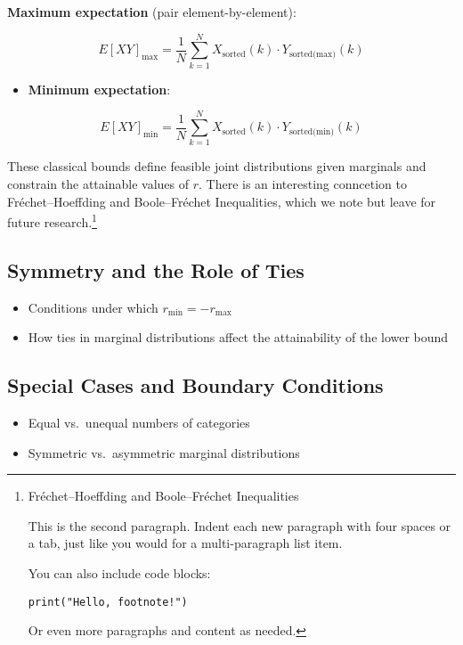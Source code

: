 \documentclass[
  12pt,
]{article}
\providecommand{\tightlist}{%
  \setlength{\itemsep}{0pt}\setlength{\parskip}{0pt}}\usepackage{longtable,booktabs,array}
\begin{document}
\textbf{Maximum expectation} (pair element-by-element):

\[E[XY]_{\text{max}} = \frac{1}{N}\sum_{k=1}^{N} X_{\text{sorted}}(k)\cdot Y_{\text{sorted(max)}}(k)\]

\begin{itemize}
\tightlist
\item
  \textbf{Minimum expectation}:
\end{itemize}

\[E[XY]_{\text{min}} = \frac{1}{N}\sum_{k=1}^{N} X_{\text{sorted}}(k)\cdot Y_{\text{sorted(min)}}(k)\]

These classical bounds define feasible joint distributions given
marginals and constrain the attainable values of \(r\). There is an
interesting conncetion to Fréchet--Hoeffding and Boole--Fréchet
Inequalities, which we note but leave for future research.\footnote{Fréchet--Hoeffding
  and Boole--Fréchet Inequalities

  This is the second paragraph. Indent each new paragraph with four
  spaces or a tab, just like you would for a multi-paragraph list item.

  You can also include code blocks:

\begin{Verbatim}
print("Hello, footnote!")
\end{Verbatim}

  Or even more paragraphs and content as needed.}

\subsection{Symmetry and the Role of
Ties}\label{symmetry-and-the-role-of-ties}

\begin{itemize}
\tightlist
\item
  Conditions under which \(r_{\min} = -r_{\max}\)
\item
  How ties in marginal distributions affect the attainability of the
  lower bound
\end{itemize}

\subsection{Special Cases and Boundary
Conditions}\label{special-cases-and-boundary-conditions}

\begin{itemize}
\tightlist
\item
  Equal vs.~unequal numbers of categories\\
\item
  Symmetric vs.~asymmetric marginal distributions
\end{itemize}
\end{document}
